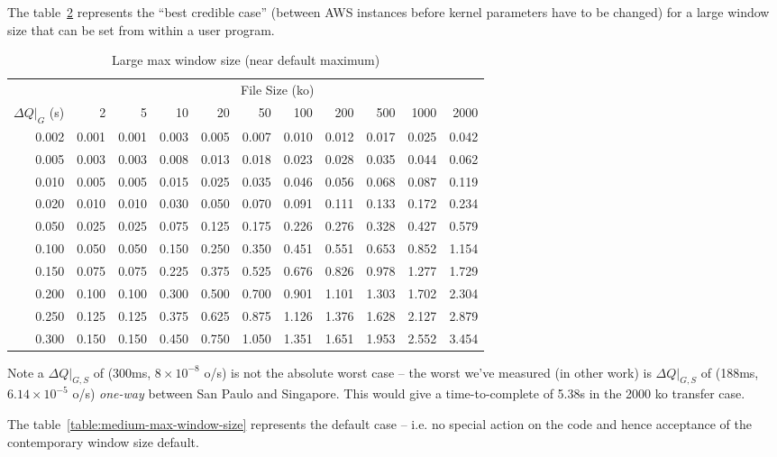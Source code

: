 \documentclass[11pt,a4paper]{article}
\begin{document}
The table~\ref{table:large-max-window-size} represents the ``best credible
case'' (between AWS instances before kernel parameters have to be changed) for
a large window size that can be set from within a user program.

\begin{table}
\begin{longtable}[]{r|rrrrrrrrrr}
\toprule
  \caption{Large max window size (near default maximum)}
  \label{table:large-max-window-size}
  \tabularnewline
\midrule
                   & \multicolumn{10}{c}{File Size (ko)} \tabularnewline
$\Delta{}Q|_G$ (s) & 2 & 5 & 10 & 20 & 50 & 100 & 200 & 500 & 1000 & 2000\tabularnewline
\midrule
\endhead
0.002 & 0.001 & 0.001 & 0.003 & 0.005 & 0.007 & 0.010 & 0.012 & 0.017 &
0.025 & 0.042\tabularnewline
0.005 & 0.003 & 0.003 & 0.008 & 0.013 & 0.018 & 0.023 & 0.028 & 0.035 &
0.044 & 0.062\tabularnewline
0.010 & 0.005 & 0.005 & 0.015 & 0.025 & 0.035 & 0.046 & 0.056 & 0.068 &
0.087 & 0.119\tabularnewline
0.020 & 0.010 & 0.010 & 0.030 & 0.050 & 0.070 & 0.091 & 0.111 & 0.133 &
0.172 & 0.234\tabularnewline
0.050 & 0.025 & 0.025 & 0.075 & 0.125 & 0.175 & 0.226 & 0.276 & 0.328 &
0.427 & 0.579\tabularnewline
0.100 & 0.050 & 0.050 & 0.150 & 0.250 & 0.350 & 0.451 & 0.551 & 0.653 &
0.852 & 1.154\tabularnewline
0.150 & 0.075 & 0.075 & 0.225 & 0.375 & 0.525 & 0.676 & 0.826 & 0.978 &
1.277 & 1.729\tabularnewline
0.200 & 0.100 & 0.100 & 0.300 & 0.500 & 0.700 & 0.901 & 1.101 & 1.303 &
1.702 & 2.304\tabularnewline
0.250 & 0.125 & 0.125 & 0.375 & 0.625 & 0.875 & 1.126 & 1.376 & 1.628 &
2.127 & 2.879\tabularnewline
0.300 & 0.150 & 0.150 & 0.450 & 0.750 & 1.050 & 1.351 & 1.651 & 1.953 &
2.552 & 3.454\tabularnewline
\bottomrule
\end{longtable}
\end{table}

Note a $\Delta{}Q|_{G,S}$ of (300ms, $8\times{}10^{-8}$ o/s) is not the
absolute worst case -- the worst we've measured (in other work) is
$\Delta{}Q|_{G,S}$ of (188ms, $6.14\times{}10^{-5}$ o/s) \emph{one-way}
between San Paulo and Singapore. This would give a time-to-complete of
5.38s in the 2000 ko transfer case.

The table~\ref{table:medium-max-window-size} represents the default case -- i.e. no special action on
the code and hence acceptance of the contemporary window size default.
\end{document}

